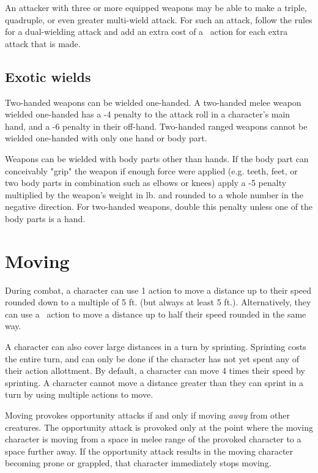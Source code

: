 \begin{multicols*}{2}
    An attacker with three or more equipped weapons may be able to make a
    triple, quadruple, or even greater multi-wield attack. For such an attack,
    follow the rules for a dual-wielding attack and add an extra cost of a
    \textonehalf\ action for each extra attack that is made.

    \subsection{Exotic wields}
    Two-handed weapons can be wielded one-handed. A two-handed melee weapon
    wielded one-handed has a -4 penalty to the attack roll in a character's
    main hand, and a -6 penalty in their off-hand. Two-handed ranged weapons
    cannot be wielded one-handed with only one hand or body part.

    Weapons can be wielded with body parts other than hands. If the body part
    can conceivably "grip" the weapon if enough force were applied (e.g. teeth,
    feet, or two body parts in combination such as elbows or knees) apply a -5
    penalty multiplied by the weapon's weight in lb. and rounded to a whole
    number in the negative direction. For two-handed weapons, double this
    penalty unless one of the body parts is a hand.

    \section{Moving}\label{combat:moving}
    During combat, a character can use 1 action to move a distance up to their
    speed rounded down to a multiple of 5 ft. (but always at least 5 ft.).
    Alternatively, they can use a \textonehalf\ action to move a distance up
    to half their speed rounded in the same way.

    A character can also cover large distances in a turn by sprinting.
    Sprinting costs the entire turn, and can only be done if the character has
    not yet spent any of their action allottment. By default, a character can
    move 4 times their speed by sprinting. A character cannot move a distance
    greater than they can sprint in a turn by using multiple actions to move.

    Moving provokes opportunity attacks if and only if moving \textit{away}
    from other creatures. The opportunity attack is provoked only at the
    point where the moving character is moving from a space in melee range of
    the provoked character to a space further away. If the opportunity attack
    results in the moving character becoming prone or grappled, that character
    immediately stops moving.


\end{multicols*}
